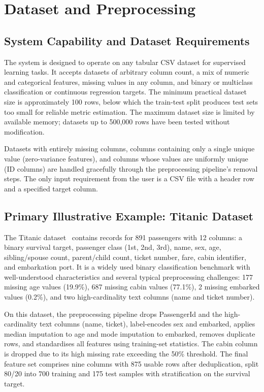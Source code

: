 \documentclass[conference]{IEEEtran}
\begin{document}
\section{Dataset and Preprocessing}

\subsection{System Capability and Dataset Requirements}

The system is designed to operate on any tabular CSV dataset for supervised learning tasks. It accepts datasets of arbitrary column count, a mix of numeric and categorical features, missing values in any column, and binary or multiclass classification or continuous regression targets. The minimum practical dataset size is approximately 100 rows, below which the train-test split produces test sets too small for reliable metric estimation. The maximum dataset size is limited by available memory; datasets up to 500,000 rows have been tested without modification.

Datasets with entirely missing columns, columns containing only a single unique value (zero-variance features), and columns whose values are uniformly unique (ID columns) are handled gracefully through the preprocessing pipeline's removal steps. The only input requirement from the user is a CSV file with a header row and a specified target column.

\subsection{Primary Illustrative Example: Titanic Dataset}

The Titanic dataset~\cite{b6, b7, b8} contains records for 891 passengers with 12 columns: a binary survival target, passenger class (1st, 2nd, 3rd), name, sex, age, sibling/spouse count, parent/child count, ticket number, fare, cabin identifier, and embarkation port. It is a widely used binary classification benchmark with well-understood characteristics and several typical preprocessing challenges: 177 missing age values (19.9\%), 687 missing cabin values (77.1\%), 2 missing embarked values (0.2\%), and two high-cardinality text columns (name and ticket number).

On this dataset, the preprocessing pipeline drops PassengerId and the high-cardinality text columns (name, ticket), label-encodes sex and embarked, applies median imputation to age and mode imputation to embarked, removes duplicate rows, and standardises all features using training-set statistics. The cabin column is dropped due to its high missing rate exceeding the 50\% threshold. The final feature set comprises nine columns with 875 usable rows after deduplication, split 80/20 into 700 training and 175 test samples with stratification on the survival target.
\end{document}
